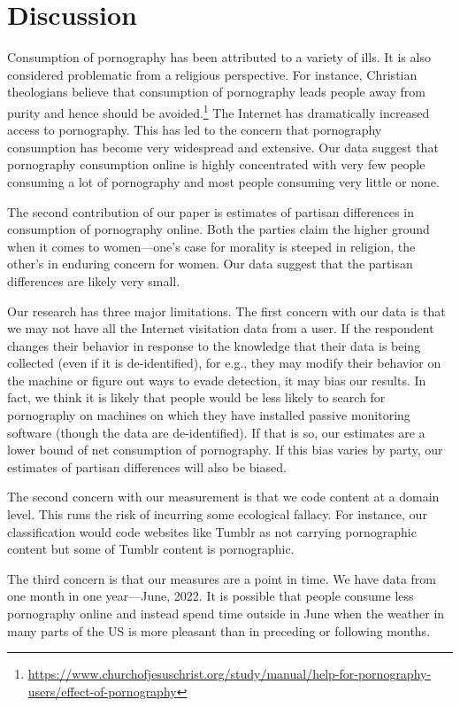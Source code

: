 \documentclass[12pt, letterpaper]{article}
\begin{document}
\section*{Discussion}\label{sec:discussion}
Consumption of pornography has been attributed to a variety of ills. It is also considered problematic from a religious perspective. For instance, Christian theologians believe that consumption of pornography leads people away from purity and hence should be avoided.\footnote{\url{https://www.churchofjesuschrist.org/study/manual/help-for-pornography-users/effect-of-pornography}} The Internet has dramatically increased access to pornography. This has led to the concern that pornography consumption has become very widespread and extensive. Our data suggest that pornography consumption online is highly concentrated with very few people consuming a lot of pornography and most people consuming very little or none.

The second contribution of our paper is estimates of partisan differences in consumption of pornography online. Both the parties claim the higher ground when it comes to women---one's case for morality is steeped in religion, the other's in enduring concern for women. Our data suggest that the partisan differences are likely very small.

Our research has three major limitations. The first concern with our data is that we may not have all the Internet visitation data from a user. If the respondent changes their behavior in response to the knowledge that their data is being collected (even if it is de-identified), for e.g., they may modify their behavior on the machine or figure out ways to evade detection, it may bias our results. In fact, we think it is likely that people would be less likely to search for pornography on machines on which they have installed passive monitoring software (though the data are de-identified). If that is so, our estimates are a lower bound of net consumption of pornography. If this bias varies by party, our estimates of partisan differences will also be biased. 

The second concern with our measurement is that we code content at a domain level. This runs the risk of incurring some ecological fallacy. For instance, our classification would code websites like Tumblr as not carrying pornographic content but some of Tumblr content is pornographic. 

The third concern is that our measures are a point in time. We have data from one month in one year---June, 2022. It is possible that people consume less pornography online and instead spend time outside in June when the weather in many parts of the US is more pleasant than in preceding or following months. 
\end{document}
